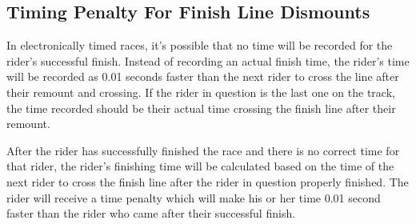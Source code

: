 \subsection{Timing Penalty For Finish Line Dismounts}
In electronically timed races, it's possible that no time will be recorded for the rider's successful finish.
Instead of recording an actual finish time, the rider's time will be recorded as 0.01 seconds faster than the next rider to cross the line after their remount and crossing.
If the rider in question is the last one on the track, the time recorded should be their actual time crossing the finish line after their remount.

After the rider has successfully finished the race and there is no correct time for that rider, the rider's finishing time will be calculated based on the time of the next rider to cross the finish line after the rider in question properly finished.
The rider will receive a time penalty which will make his or her time 0.01 second faster than the rider who came after their successful finish.

